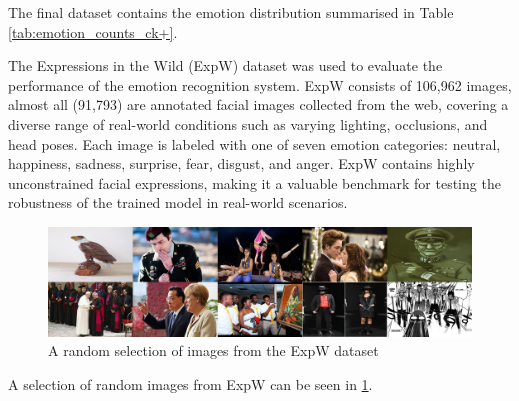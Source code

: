 The final dataset contains the emotion distribution summarised in Table \ref{tab:emotion_counts_ck+}.


The Expressions in the Wild (ExpW) dataset was used to evaluate the performance of the emotion recognition system. ExpW consists of 106,962 images, almost all (91,793) are annotated facial images collected from the web, covering a diverse range of real-world conditions such as varying lighting, occlusions, and head poses. Each image is labeled with one of seven emotion categories: neutral, happiness, sadness, surprise, fear, disgust, and anger. ExpW contains highly unconstrained facial expressions, making it a valuable benchmark for testing the robustness of the trained model in real-world scenarios.

\begin{figure}[!htb]
    \centering{}
    \includegraphics[scale=0.18]{fed_images/exp_w_sample.jpg}
    \caption{A random selection of images from the ExpW dataset}
    \label{figure:exp_w_sample}
\end{figure}

A selection of random images from ExpW can be seen in \ref{figure:exp_w_sample}.


